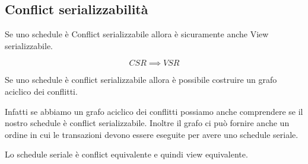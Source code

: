 \subsection{Conflict serializzabilità}

Se uno schedule è Conflict serializzabile allora è sicuramente anche View serializzabile.

\[CSR \implies VSR\]

Se uno schedule è conflict serializzabile allora è possibile costruire un grafo aciclico dei conflitti.

Infatti se abbiamo un grafo aciclico dei conflitti possiamo anche comprendere se il nostro schedule è conflict serializzabile. Inoltre il grafo ci può fornire anche un ordine in cui le transazioni devono essere eseguite per avere uno schedule seriale.

Lo schedule seriale è conflict equivalente e quindi view equivalente.